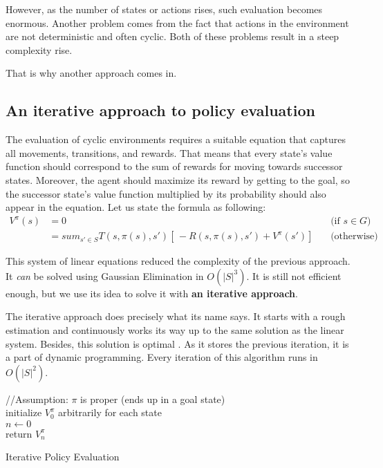 However, as the number of states or actions rises, such evaluation becomes enormous. Another problem comes from the fact that actions in the environment are not deterministic and often cyclic. Both of these problems result in a steep complexity rise.

That is why another approach comes in.

\subsection{An iterative approach to policy evaluation}

The evaluation of cyclic environments requires a suitable equation that captures all movements, transitions, and rewards.
That means that every state's value function should correspond to the sum of rewards for moving towards successor states. Moreover, the agent should maximize its reward by getting to the goal, so the successor state's value function multiplied by its probability should also appear in the equation. Let us state the formula as following:\\
\begin{equation}
\begin{aligned}
V^{\pi} (s) & = 0 && \text{(if $s \in G$)} \\
& = sum_{s' \in S} T(s, \pi (s), s') [ \,-R(s, \pi(s), s') + V^{\pi} (s')] \, && \text{(otherwise)}
\end{aligned}
\end{equation}

This system of linear equations reduced the complexity of the previous approach. It \textit{can} be solved using Gaussian Elimination in $O(|S|^3)$. It is still not efficient enough, but we use its idea to solve it with \textbf{an iterative approach}.

The iterative approach does precisely what its name says. 
It starts with a rough estimation and continuously works its way up to the same solution as the linear system. Besides, this solution is optimal \cite{Kolobov2012}. As it stores the previous iteration, it is a part of dynamic programming. Every iteration of this algorithm runs in $O(|S|^2)$.

\LinesNumbered
\begin{algorithm}[ht]
\SetAlgoLined
//Assumption: $\pi$ is proper (ends up in a goal state) \\
initialize $V^{\pi}_0$ arbitrarily for each state \\
$n \xleftarrow{} 0$ \\
return $V^{\pi}_n$
\caption{Iterative Policy Evaluation}
\end{algorithm}

